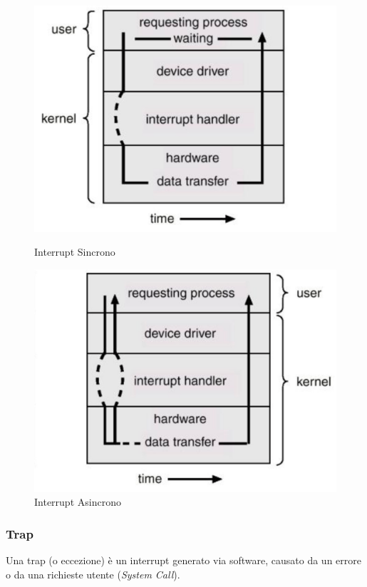 \begin{figure}[H]
    \centering
    \begin{minipage}{0.4\textwidth}
        \centering
        \includegraphics[width=0.8\linewidth]{assets/interrupt-sync.jpeg}
        \caption{Interrupt Sincrono}
    \end{minipage}
    \hspace{0.01\textwidth}
    \begin{minipage}{0.4\textwidth}
        \centering
        \includegraphics[width=0.8\linewidth]{assets/interrupt-async.jpeg}
        \caption{Interrupt Asincrono}
    \end{minipage}
\end{figure}

\subsubsection{Trap}
Una trap (o eccezione) è un interrupt generato via software, causato da un errore o da una richieste utente (\textit{System Call}).

